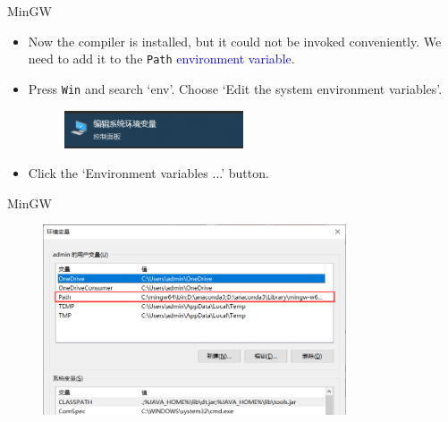 \documentclass[handout]{beamer}
\newcommand{\blue}[1]{\textcolor{blue}{#1}}
\begin{document}
\begin{frame}{MinGW}
    \begin{itemize}
        \item Now the compiler is installed, but it could not be invoked conveniently. We need to add it to the \texttt{Path} \blue{environment variable}.
        \item Press \texttt{Win} and search `env'. Choose `Edit the system environment variables'.
        \begin{figure}[h]
            \centering
            \includegraphics[width=0.5\textwidth]{figures/start_env.png}
        \end{figure}
        \item Click the `Environment variables ...' button.
    \end{itemize}
\end{frame}

\begin{frame}{MinGW}
    \begin{figure}[h]
        \centering
        \includegraphics[width=0.8\textwidth]{figures/env_var.png}
    \end{figure}
\end{frame}
\end{document}
